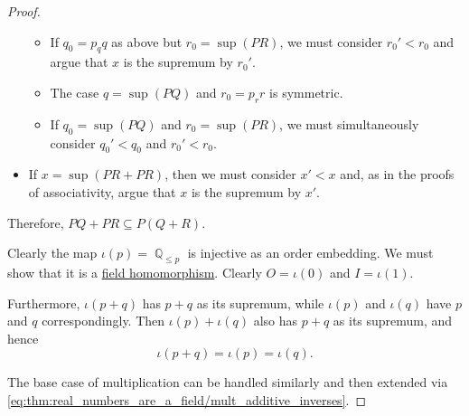 \begin{proof}
\begin{itemize}
\begin{itemize}
      \item If \( q_0 = p_q q \) as above but \( r_0 = \sup(PR) \), we must consider \( r_0' < r_0 \) and argue that \( x \) is the supremum by \( r_0' \).

      \item The case \( q = \sup(PQ) \) and \( r_0 = p_r r \) is symmetric.

      \item If \( q_0 = \sup(PQ) \) and \( r_0 = \sup(PR) \), we must simultaneously consider \( q_0' < q_0 \) and \( r_0' < r_0 \).
    \end{itemize}

    \item If \( x = \sup(PR + PR) \), then we must consider \( x' < x \) and, as in the proofs of associativity, argue that \( x \) is the supremum by \( x' \).
  \end{itemize}

  Therefore, \( PQ + PR \subseteq P(Q + R) \).

   Clearly the map \( \iota(p) = \BbbQ_{\leq p} \) is injective as an order embedding. We must show that it is a \hyperref[def:field/homomorphism]{field homomorphism}. Clearly \( O = \iota(0) \) and \( I = \iota(1) \).

  Furthermore, \( \iota(p + q) \) has \( p + q \) as its supremum, while \( \iota(p) \) and \( \iota(q) \) have \( p \) and \( q \) correspondingly. Then \( \iota(p) + \iota(q) \) also has \( p + q \) as its supremum, and hence
  \begin{equation*}
    \iota(p + q) = \iota(p) = \iota(q).
  \end{equation*}

  The base case of multiplication can be handled similarly and then extended via \eqref{eq:thm:real_numbers_are_a_field/mult_additive_inverses}.
\end{proof}

